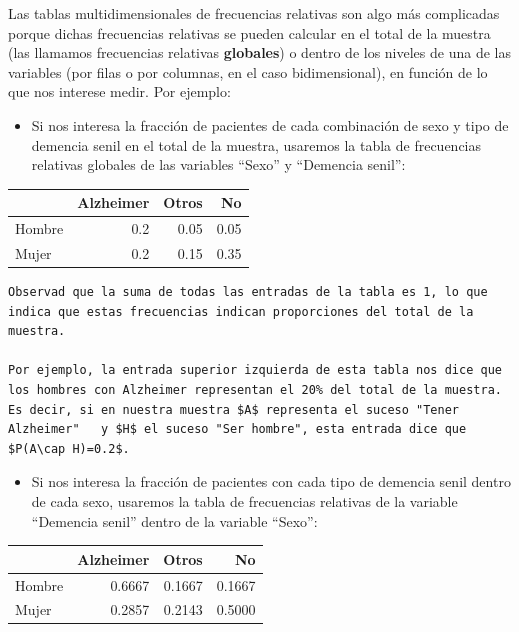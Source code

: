 \documentclass[
]{book}
\providecommand{\tightlist}{%
  \setlength{\itemsep}{0pt}\setlength{\parskip}{0pt}}
\theoremstyle{definition}
\theoremstyle{definition}
\theoremstyle{definition}
\theoremstyle{definition}
\theoremstyle{remark}
\begin{document}
Las tablas multidimensionales de frecuencias relativas son algo más complicadas porque dichas frecuencias relativas se pueden calcular en el total de la muestra (las llamamos frecuencias relativas \textbf{globales}) o dentro de los niveles de una de las variables (por filas o por columnas, en el caso bidimensional), en función de lo que nos interese medir. Por ejemplo:

\begin{itemize}
\tightlist
\item
  Si nos interesa la fracción de pacientes de cada combinación de sexo y tipo de demencia senil en el total de la muestra, usaremos la tabla de frecuencias relativas globales de las variables ``Sexo'' y ``Demencia senil'':
\end{itemize}

\begin{tabular}{l|r|r|r}
\hline
  & Alzheimer & Otros & No\\
\hline
Hombre & 0.2 & 0.05 & 0.05\\
\hline
Mujer & 0.2 & 0.15 & 0.35\\
\hline
\end{tabular}

\begin{verbatim}
Observad que la suma de todas las entradas de la tabla es 1, lo que indica que estas frecuencias indican proporciones del total de la muestra.

Por ejemplo, la entrada superior izquierda de esta tabla nos dice que los hombres con Alzheimer representan el 20% del total de la muestra. Es decir, si en nuestra muestra $A$ representa el suceso "Tener Alzheimer"   y $H$ el suceso "Ser hombre", esta entrada dice que $P(A\cap H)=0.2$.   
\end{verbatim}

\begin{itemize}
\tightlist
\item
  Si nos interesa la fracción de pacientes con cada tipo de demencia senil dentro de cada sexo, usaremos la tabla de frecuencias relativas de la variable ``Demencia senil'' dentro de la variable ``Sexo'':
\end{itemize}

\begin{tabular}{l|r|r|r}
\hline
  & Alzheimer & Otros & No\\
\hline
Hombre & 0.6667 & 0.1667 & 0.1667\\
\hline
Mujer & 0.2857 & 0.2143 & 0.5000\\
\hline
\end{tabular}
\end{document}

